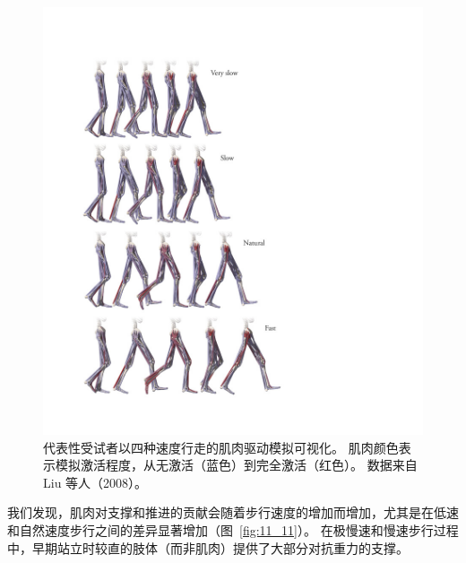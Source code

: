 \begin{figure}[!htb]
	\centering
	\includegraphics[width=1.0\linewidth]{chap11/11_10}
	\caption{代表性受试者以四种速度行走的肌肉驱动模拟可视化。
		肌肉颜色表示模拟激活程度，从无激活（蓝色）到完全激活（红色）。
		数据来自 Liu 等人（2008）。 \label{fig:11_10}}
\end{figure}


我们发现，肌肉对支撑和推进的贡献会随着步行速度的增加而增加，尤其是在低速和自然速度步行之间的差异显著增加（图~\ref{fig:11_11}）。
在极慢速和慢速步行过程中，早期站立时较直的肢体（而非肌肉）提供了大部分对抗重力的支撑。


